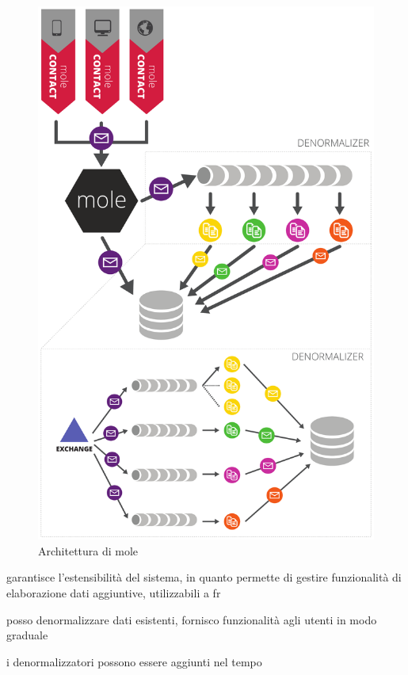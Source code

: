 



\begin{figure}[h]
\centering
\includegraphics[width=1.0\linewidth]{./img/mole}
\caption[Architettura di mole]{Architettura di mole}
\label{fig:mole}
\end{figure}

 garantisce l'estensibilità del sistema, in quanto permette di gestire funzionalità di elaborazione dati aggiuntive, utilizzabili a fr



posso denormalizzare dati esistenti, fornisco funzionalità agli utenti in modo graduale

i denormalizzatori possono essere aggiunti nel tempo